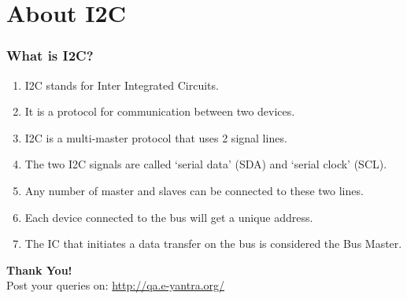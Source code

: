 \documentclass[10pt,red]{beamer}
\title
[
	Raspberry Pi Hardware Development	%
	\hspace{0.5cm}
	\insertframenumber/\inserttotalframenumber
]
{
	I2C enabling on Raspberry Pi
}
\author
[
	www.e-yantra.org
]
{
	e-Yantra Team \\
  Embedded Real-Time Systems Lab\\
  Indian Institute of Technology-Bombay \\
}
\date
{
IIT Bombay \\ {\today}
}
\begin{document}
 

\begin{frame}
	\titlepage
\end{frame} 
\section{About I2C}
\begin{frame}
	\frametitle{What is I2C?}  \pause
	\begin{enumerate}[$\checkmark$]
		\item<+-|alert@+> I2C stands for Inter Integrated Circuits.
		\item<+-|alert@+> It is a protocol for communication between two devices.
		\item<+-|alert@+> I2C is a multi-master protocol that uses 2 signal lines.
		\item<+-|alert@+> The two I2C signals are called ‘serial data’ (SDA) and ‘serial clock’ (SCL).
		\item<+-|alert@+> Any number of master and slaves can be connected to these two lines.
		\item<+-|alert@+> Each device connected to the bus will get a unique address.
		\item<+-|alert@+> The IC that initiates a data transfer on the bus is considered the Bus Master.
		
	\end{enumerate}
\end{frame}

\begin{frame}
	\hskip4cm
	\textbf{\LARGE Thank You!} \\[20pt]
	\hskip3cm
	\scriptsize Post your queries on: 
	\hyperref[www.e-yantra.org]{\color{blue} http://qa.e-yantra.org/ \color{black}} 
\end{frame}
\end{document}
